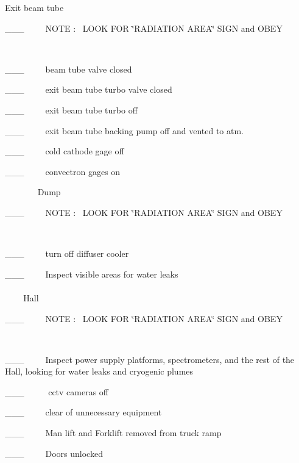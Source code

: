 Exit beam tube

\_\_\_~~~~~NOTE :~ LOOK FOR \char`\"{}RADIATION AREA\char`\"{} SIGN and OBEY

~

\_\_\_~~~~~beam tube valve closed 

\_\_\_~~~~~exit beam tube turbo valve closed

\_\_\_~~~~~exit beam tube turbo off 

\_\_\_~~~~~exit beam tube backing pump off and vented to atm.

\_\_\_~~~~~cold cathode gage off

\_\_\_~~~~~convectron gages on

~
~
~
~
~Dump

\_\_\_~~~~~NOTE :~ LOOK FOR \char`\"{}RADIATION AREA\char`\"{} SIGN and OBEY

~

\_\_\_~~~~~turn off diffuser cooler

\_\_\_~~~~~Inspect visible areas for water leaks
\\
\\
~
~
~Hall 

\_\_\_~~~~~NOTE :~ LOOK FOR \char`\"{}RADIATION AREA\char`\"{} SIGN and OBEY

~

\_\_\_~~~~~Inspect power supply platforms, spectrometers, and the rest of the
Hall, looking for water leaks and cryogenic plumes

\_\_\_~~~~~ cctv cameras off

\_\_\_~~~~~clear of unnecessary equipment

\_\_\_~~~~~Man lift and Forklift removed from truck ramp

\_\_\_~~~~~Doors unlocked

~

~

